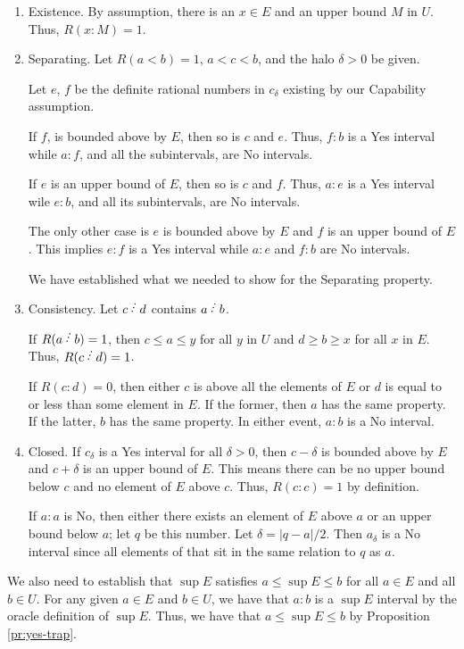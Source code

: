 \documentclass[12pt]{article}
\begin{document}
\begin{enumerate}
    \item Existence. By assumption, there is an $x \in E$ and an upper bound $M$ in $U$. Thus, $R(x:M) = 1$. 
    \item Separating. Let $R(a\lt b)=1$, $a < c< b$, and the halo $\delta > 0$ be given. 

    Let $e$, $f$ be the definite rational numbers in $c_\delta$ existing by our Capability assumption. 

    If $f$, is bounded above by $E$, then so is $c$ and $e$. Thus, $f:b$ is a Yes interval while $a:f$, and all the subintervals, are No intervals. 

    If $e$ is an upper bound of $E$, then so is $c$ and $f$. Thus, $a:e$ is a Yes interval wile $e:b$, and all its subintervals, are No intervals. 

    The only other case is $e$ is bounded above by $E$ and $f$ is an upper bound of $E$. This implies $e:f$ is a Yes interval while $a:e$ and $f:b$ are No intervals. 

    We have established what we needed to show for the Separating property. 
    
    \item Consistency. Let $c\lte d$ contains $a\lte b$. 
    
    If $R(a\lte b)=1$, then $c \leq a \leq y$ for all $y$ in $U$ and $d \geq b \geq x$ for all $x$ in $E$. Thus, $R(c\lte d) = 1$.

    If $R(c:d) = 0$, then either $c$ is above all the elements of $E$ or $d$ is equal to or less than some element in $E$. If the former, then $a$ has the same property. If the latter, $b$ has the same property. In either event, $a:b$ is a No interval. 

    
    \item Closed. If $c_\delta$ is a Yes interval for all $\delta > 0$, then $c-\delta$ is bounded above by $E$ and $c+\delta$ is an upper bound of $E$. This means there can be no upper bound below $c$ and no element of $E$ above $c$.  Thus, $R(c:c) = 1$ by definition. 

    If $a:a$ is No, then either there exists an element of $E$ above $a$ or an upper bound below $a$; let $q$ be this number. Let $\delta = |q-a|/2$. Then $a_\delta$ is a No interval since all elements of that sit in the same relation to $q$ as $a$.
    \end{enumerate}

We also need to establish that $\sup E$ satisfies $a \leq \sup E \leq b$ for all $a \in E$ and all $b \in U$. For any given $a \in E$ and $b \in U$, we have that $a:b$ is a $\sup E$ interval by the oracle definition of $\sup E$. Thus, we have that $a \leq \sup E \leq b$ by Proposition \ref{pr:yes-trap}. 
\end{document}
